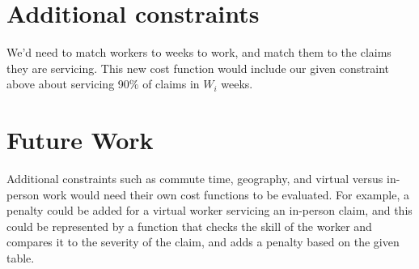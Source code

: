 \documentclass[12pt]{article}
\begin{document}
\section*{Additional constraints}
We'd need to match workers to weeks to work, and match them to the claims they are servicing.
This new cost function would include our given constraint above about servicing 90$\%$ of claims in $W_i$ weeks.
\section*{Future Work}
Additional constraints such as commute time, geography, and virtual versus in-person work would
need their own cost functions to be evaluated. For example, a penalty could be added for a virtual
worker servicing an in-person claim, and this could be represented by a function that checks the
skill of the worker and compares it to the severity of the claim, and adds a penalty based on the given table.
\end{document}
